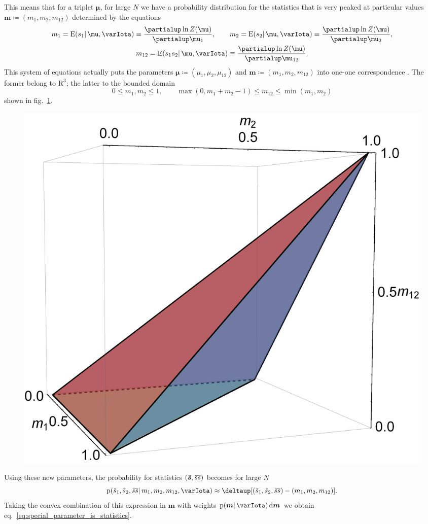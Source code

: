 \documentclass[\ifafour a4paper,12pt,\else a5paper,10pt,\fi%
onecolumn,oneside,article,%
british%
]{memoir}
\theoremstyle{remark}
\theoremstyle{innote}
\newcommand*{\citep}{\parencites}
\newcommand*{\de}{\partialup}%
\newcommand*{\delt}{\deltaup}%
\newcommand*{\di}{\mathrm{d}}%
\newcommand*{\RR}{\bm{\mathrm{R}}}
\newcommand*{\defd}{\coloneqq}
\renewcommand{\le}{\leqslant}%
\newcommand*{\pf}{\mathrm{p}}%
\renewcommand*{\|}{\mathpunct{|}}
\newcommand*{\eqn}{eq.}%
\newcommand*{\fig}{fig.}%
\newcommand*{\E}{\mathrm{E}}
\DeclarePairedDelimiter\expp{(}{)}
\newcommand*{\expe}{\E\expp}%
\newcommand*{\widebar}[1]{{\mkern1.5mu\skew{2}\overline{\mkern-1.5mu#1\mkern-1.5mu}\mkern 1.5mu}}
\newcommand*{\yI}{\varIota}
\newcommand*{\ys}{\bm{s}}
\newcommand*{\la}{\mu_{12}}
\newcommand*{\yth}{\bm{\mu}}
\newcommand*{\yt}{\bm{m}}
\newcommand*{\yl}{m_{12}}
\newcommand*{\yav}{\widebar{\ys}}
\newcommand*{\yavv}{\widebar{s}}
\newcommand*{\ycv}{\widebar{ss}}
\begin{document}
This means that for a triplet $\yth$, for large $N$ we have a probability
distribution for the statistics that is very peaked at particular values
$\yt \defd (m_1,m_2,\yl)$ determined by the equations
\begin{equation}
  \label{eq:change_coords}
  \begin{gathered}
    m_1 = \expe{s_1 \|\yth,\yI}
    \equiv \frac{\de\ln Z(\yth)}{\de \mu_1},
    \qquad
  m_2 = \expe{s_2 \|\yth,\yI}
    \equiv \frac{\de\ln Z(\yth)}{\de \mu_2},\\
  \yl = \expe{s_1 s_2\|\yth,\yI}
    \equiv \frac{\de\ln Z(\yth)}{\de\la}.
  \end{gathered}
\end{equation}
This system of equations actually puts the parameters
$\yth \defd(\mu_1, \mu_2, \la)$
and $\yt\defd(m_1, m_2,\yl)$ into one-one
correspondence \citep{meadetal1984}. The former belong to $\RR^3$; the
latter to the bounded domain
\begin{equation}
  \label{eq:domain_newcoords}
  0\le m_1,m_2 \le 1,
  \qquad
  \max(0,m_1 + m_2 -1) \le \yl \le \min(m_1,m_2)
\end{equation}
shown in \fig~\ref{fig:domain}.
\begin{figure}%
  \centering\includegraphics[width=0.75\linewidth]{domain.png}\\
  \caption{}
  \label{fig:domain}
\end{figure}%

Using these new parameters, the probability for statistics $(\yav,\ycv)$
becomes for large $N$
\begin{equation}
  \label{eq:prob_stat_newparams}
  \pf(\yavv_1,\yavv_2,\ycv \|m_1,m_2,\yl,\yI)
  \approx \delt[(\yavv_1,\yavv_2,\ycv)- (m_1, m_2, \yl)].
\end{equation}
Taking the convex combination of this expression in $\yt$ with weights
$\pf(\yt \|\yI)\,\di\yt$ we obtain
\eqn~\eqref{eq:special_parameter_is_statistics}.
\end{document}
